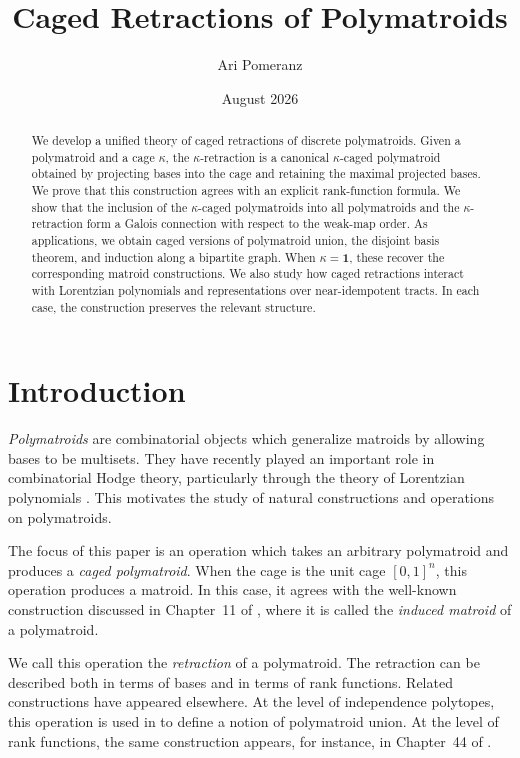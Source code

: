 \documentclass[11pt]{article}
\title{Caged Retractions of Polymatroids}
\author{Ari Pomeranz}
\date{August 2026}
\theoremstyle{definition}
\theoremstyle{remark}
\newcommand{\ones}{\textbf{1}}
\begin{document}
\maketitle
\begin{abstract}
We develop a unified theory of caged retractions of discrete polymatroids. Given a polymatroid and a cage $\kappa$, the $\kappa$-retraction is a canonical $\kappa$-caged polymatroid obtained by projecting bases into the cage and retaining the maximal projected bases. We prove that this construction agrees with an explicit rank-function formula. We show that the inclusion of the $\kappa$-caged polymatroids into all
polymatroids and the $\kappa$-retraction form a Galois connection with
respect to the weak-map order. As applications, we obtain caged versions of polymatroid union, the disjoint basis theorem, and induction along a bipartite graph. When $\kappa=\ones$, these recover the corresponding matroid constructions. We also study how caged retractions interact with Lorentzian polynomials and representations over near-idempotent tracts. In each case, the construction preserves the relevant structure.
\end{abstract}


\section{Introduction}

\textit{Polymatroids} are combinatorial objects which generalize matroids by allowing bases to be multisets. They have recently played an important role in combinatorial Hodge theory, particularly through the theory of Lorentzian polynomials \cite{branden2024lorentzianpolynomials}. This motivates the study of natural constructions and operations on polymatroids.

The focus of this paper is an operation which takes an arbitrary polymatroid and produces a \emph{caged polymatroid}. When the cage is the unit cage $[0,1]^n$, this operation produces a matroid. In this case, it agrees with the well-known construction discussed in Chapter~11 of \cite{oxleyMatroidTheory2011}, where it is called the \emph{induced matroid} of a polymatroid.

We call this operation the \emph{retraction} of a polymatroid. The retraction can be described both in terms of bases and in terms of rank functions. Related constructions have appeared elsewhere. At the level of independence polytopes, this operation is used in \cite{eur2023intersectiontheorypolymatroids} to define a notion of polymatroid union. At the level of rank functions, the same construction appears, for instance, in Chapter~44 of \cite{schrijver2003combinatorialB}.
\end{document}
